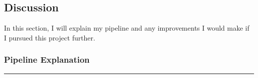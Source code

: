 \documentclass[11pt]{article}
\begin{document}
    \hypertarget{discussion}{%
\subsection{Discussion}\label{discussion}}

In this section, I will explain my pipeline and any improvements I would
make if I pursued this project further.

\hypertarget{pipeline-explanation}{%
\subsubsection{Pipeline Explanation}\label{pipeline-explanation}}

\begin{center}\rule{0.5\linewidth}{\linethickness}\end{center}
\end{document}
